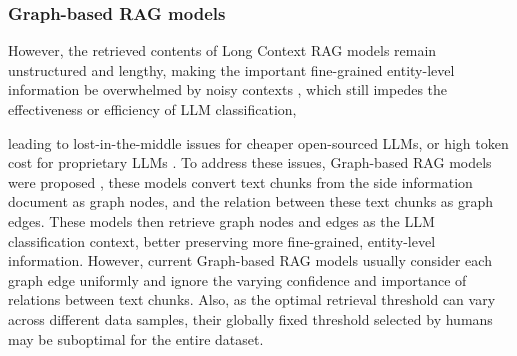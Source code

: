 \subsubsection{\textbf{Graph-based RAG models}}
However, the retrieved contents of Long Context RAG models remain unstructured and lengthy, making the important fine-grained entity-level information be overwhelmed by noisy contexts \cite{edge2024local,guo2024lightrag}, which still impedes the effectiveness or efficiency of LLM classification, 

leading to lost-in-the-middle issues \cite{liu2024lost} for cheaper open-sourced LLMs, or high token cost for proprietary LLMs \cite{hurst2024gpt}. 
To address these issues, Graph-based RAG models were proposed
\cite{peng2024graph,zhang2024graph,wu2024medical,zhang2024knowgpt,guo2024lightrag,gutierrez2024hipporag,gutiérrez2025ragmemory},
 these models
convert text chunks from the side information document as graph nodes, and the relation between these text chunks as graph edges. These models then retrieve graph nodes and edges as the LLM classification context, better preserving more fine-grained, entity-level information.
However, current Graph-based RAG models usually consider each graph edge uniformly and ignore the varying confidence and importance of relations between text chunks. Also, as the optimal retrieval threshold can vary across different data samples, their globally fixed threshold selected by humans may be suboptimal for the entire dataset. 